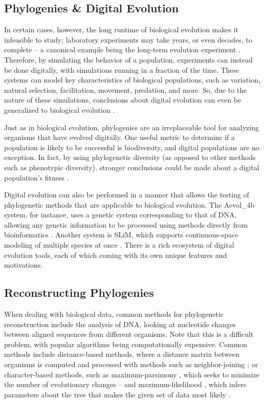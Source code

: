 \subsection{Phylogenies \& Digital Evolution} \label{sec:introduction:digital}

In certain cases, however, the long runtime of biological evolution makes it infeasible to study; laboratory experiments may take years, or even decades, to complete -- a canonical example being the long-term evolution experiment \citep{wiser2013long}.
Therefore, by simulating the behavior of a population, experiments can instead be done digitally, with simulations running in a fraction of the time.
These systems can model key characteristics of biological populations, such as variation, natural selection, facilitation, movement, predation, and more.
So, due to the nature of these simulations, conclusions about digital evolution can even be generalized to biological evolution \citep{pennock2007models, dolson2021digital}.

Just as in biological evolution, phylogenies are an irreplaceable tool for analyzing organisms that have evolved digitally.
One useful metric to determine if a population is likely to be successful is biodiversity, and digital populations are no exception.
In fact, by using phylogenetic diversity (as opposed to other methods such as phenotypic diversity), stronger conclusions could be made about a digital population's fitness \citep{hernandez2022phylogenetic}.

Digital evolution can also be performed in a manner that allows the testing of phylogenetic methods that are applicable to biological evolution.
The Aevol\_4b system, for instance, uses a genetic system corresponding to that of DNA, allowing any genetic information to be processed using methods directly from bioinformatics \citep{daudey2024aevol}.
Another system is SLiM, which supports continuous-space modeling of multiple species at once \citep{haller2023slim}.
There is a rich ecosystem of digital evolution tools, each of which coming with its own unique features and motivations.

\subsection{Reconstructing Phylogenies} \label{sec:introduction:reconst}

When dealing with biological data, common methods for phylogenetic reconstruction include the analysis of DNA, looking at nucleotide changes between aligned sequences from different organisms. Note that this is a difficult problem, with popular algorithms being computationally expensive.
Common methods include distance-based methods, where a distance matrix between organisms is computed and processed with methods such as neighbor-joining \citep{saitou1987neighbor}; or character-based methods, such as maximum-parsimony \citep{sober1991reconstructing}, which seeks to minimize the number of evolutionary changes -- and maximum-likelihood \citep{felsenstein1981evolutionary}, which infers parameters about the tree that makes the given set of data most likely \citep{de2014phylogenetic}.


